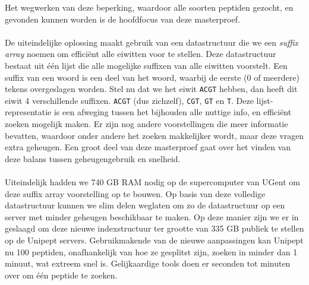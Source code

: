 Het wegwerken van deze beperking, waardoor alle soorten peptiden gezocht, en gevonden kunnen worden is de hoofdfocus van deze masterproef.
\\ \\
De uiteindelijke oplossing maakt gebruik van een datastructuur die we een \textit{suffix array} noemen om efficiënt alle eiwitten voor te stellen.
Deze datastructuur bestaat uit één lijst die alle mogelijke suffixen van alle eiwitten voorstelt.
Een suffix van een woord is een deel van het woord, waarbij de eerste (0 of meerdere) tekens overgeslagen worden.
Stel nu dat we het eiwit \texttt{ACGT} hebben, dan heeft dit eiwit 4 verschillende suffixen.
\texttt{ACGT} (dus zichzelf), \texttt{CGT}, \texttt{GT} en \texttt{T}.
Deze lijst-representatie is een afweging tussen het bijhouden alle nuttige info, en efficiënt zoeken mogelijk maken.
Er zijn nog andere voorstellingen die meer informatie bevatten, waardoor onder andere het zoeken makkelijker wordt, maar deze vragen extra geheugen.
Een groot deel van deze masterproef gaat over het vinden van deze balans tussen geheugengebruik en snelheid.
\\ \\
Uiteindelijk hadden we 740 GB RAM nodig op de supercomputer van UGent om deze suffix array voorstelling op te bouwen.
Op basis van deze volledige datastructuur kunnen we slim delen weglaten om zo de datastructuur op een server met minder geheugen beschikbaar te maken.
Op deze manier zijn we er in geslaagd om deze nieuwe indexstructuur ter grootte van 335 GB publiek te stellen op de Unipept servers.
Gebruikmakende van de nieuwe aanpassingen kan Unipept nu 100 peptiden, onafhankelijk van hoe ze gesplitst zijn, zoeken in minder dan 1 minuut, wat extreem snel is.
Gelijkaardige tools doen er seconden tot minuten over om één peptide te zoeken.
